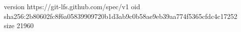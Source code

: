 version https://git-lfs.github.com/spec/v1
oid sha256:2b80602fc8f6a05839909720b1d3ab9c0b58ae9eb39aa774f5365cfdc4c17252
size 21960
